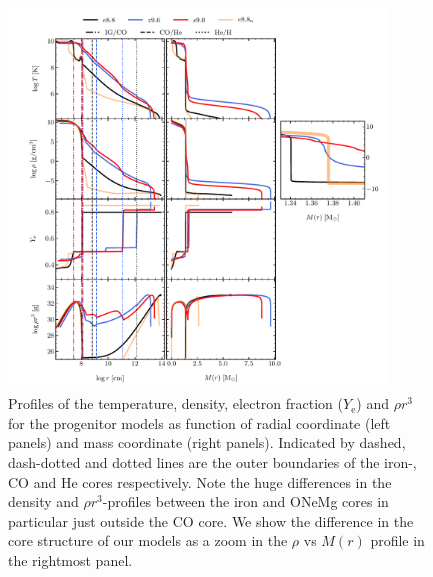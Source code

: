 \documentclass[fleqn,usenatbib]{mnras}
\begin{document}
\begin{figure}
 \centering
 \includegraphics[width=0.9\textwidth,trim=1cm 0.0cm 1cm 0cm]{./pic/progenitors_tem_rho_ye_rhor_paper.pdf}
 \caption{Profiles of the temperature, density, electron fraction ($Y_{\text{e}}$) and $\rho r^3$ for the progenitor models as function of radial coordinate (left panels) and mass coordinate (right panels). Indicated by dashed, dash-dotted and dotted lines are the outer boundaries of the iron-, CO and He cores respectively. Note the huge differences in the density and $\rho r^3$-profiles between the iron and ONeMg cores in particular just outside the CO core. We show the difference in the core structure of our models as a zoom in the $\rho$ vs $M(r)$ profile in the rightmost panel.}
 \label{fig:prog_tem_rho_ye_rhor}
\end{figure}
\end{document}
